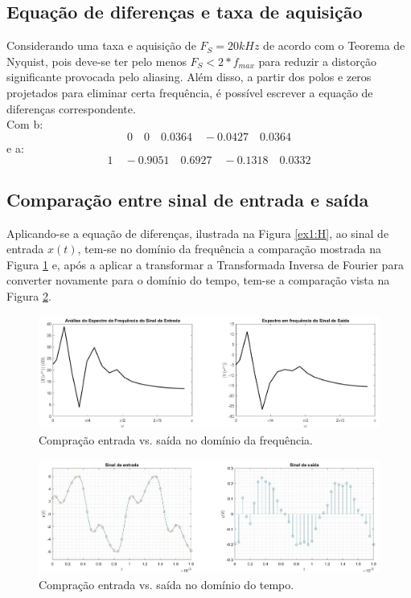 \documentclass[a4paper,12pt,oneside,openany,table,xcdraw]{article}
\begin{document}
\subsection{Equação de diferenças e taxa de aquisição}
Considerando uma taxa e aquisição de $F_S=20kHz$ de acordo com o Teorema de Nyquist, pois deve-se ter pelo menos $F_S<2*f_{max}$ para reduzir a distorção significante provocada pelo aliasing. Além disso, a partir dos polos e zeros projetados para eliminar certa frequência, é possível escrever a equação de diferenças correspondente. \\
Com b:
$$0\quad   0\quad   0.0364\quad -0.0427\quad 0.0364$$
e a:
$$1\quad -0.9051\quad 0.6927\quad -0.1318\quad 0.0332$$

\vspace{0.3cm}
\subsection{Comparação entre sinal de entrada e saída}
Aplicando-se a equação de diferenças, ilustrada na Figura \ref{ex1:H}, ao sinal de entrada $x(t)$, tem-se no domínio da frequência a comparação mostrada na Figura \ref{ex1:comp:H} e, após a aplicar a transformar a Transformada Inversa de Fourier para converter novamente para o domínio do tempo, tem-se a comparação vista na Figura \ref{ex1:comp:t}.


\begin{figure}[H]
\centering
\includegraphics[width=15cm]{ex1-comp-H}
\caption{Compração entrada vs. saída no domínio da frequência.}
\label{ex1:comp:H}
\end{figure}
\vspace{0.1cm}

\begin{figure}[H]
\centering
\includegraphics[width=15cm]{ex1-comp-t}
\caption{Compração entrada vs. saída no domínio do tempo.}
\label{ex1:comp:t}
\end{figure}
\vspace{0.1cm}
\end{document}
